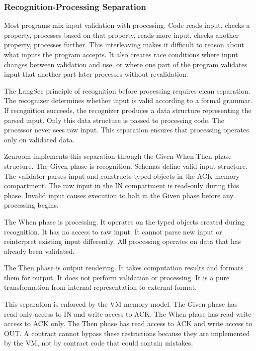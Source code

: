\subsubsection{Recognition-Processing Separation}

Most programs mix input validation with processing. Code reads input,
checks a property, processes based on that property, reads more input,
checks another property, processes further. This interleaving makes it
difficult to reason about what inputs the program accepts. It also
creates race conditions where input changes between validation and
use, or where one part of the program validates input that another
part later processes without revalidation.

The LangSec principle of recognition before processing requires clean
separation. The recognizer determines whether input is valid according
to a formal grammar. If recognition succeeds, the recognizer produces
a data structure representing the parsed input. Only this data
structure is passed to processing code. The processor never sees raw
input. This separation ensures that processing operates only on
validated data.

Zenroom implements this separation through the Given-When-Then phase
structure. The Given phase is recognition. Schemas define valid input
structure. The validator parses input and constructs typed objects in
the ACK memory compartment. The raw input in the IN compartment is
read-only during this phase. Invalid input causes execution to halt in
the Given phase before any processing begins.

The When phase is processing. It operates on the typed objects created
during recognition. It has no access to raw input. It cannot parse new
input or reinterpret existing input differently. All processing
operates on data that has already been validated.

The Then phase is output rendering. It takes computation results and
formats them for output. It does not perform validation or
processing. It is a pure transformation from internal representation
to external format.

This separation is enforced by the VM memory model. The Given phase
has read-only access to IN and write access to ACK. The When phase has
read-write access to ACK only. The Then phase has read access to ACK
and write access to OUT. A contract cannot bypass these restrictions
because they are implemented by the VM, not by contract code that
could contain mistakes.


